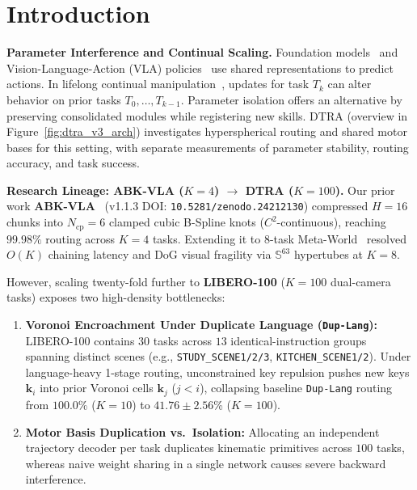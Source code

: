 \documentclass[10pt]{article}
\begin{document}
\section{Introduction}
\label{sec:intro}

\textbf{Parameter Interference and Continual Scaling.}
Foundation models~\cite{bommasani2021foundation} and Vision-Language-Action (VLA) policies~\cite{vaswani2017attention,brohan2023rt1,brohan2023rt2,octo2024,kim2024openvla,black2024pi0} use shared representations to predict actions. In lifelong continual manipulation~\cite{yu2020metaworld,wolczyk2021continual,liu2023libero}, updates for task $T_k$ can alter behavior on prior tasks $T_0, \dots, T_{k-1}$. Parameter isolation offers an alternative by preserving consolidated modules while registering new skills. DTRA (overview in Figure~\ref{fig:dtra_v3_arch}) investigates hyperspherical routing and shared motor bases for this setting, with separate measurements of parameter stability, routing accuracy, and task success.

\textbf{Research Lineage: ABK-VLA ($K=4$) $\to$ DTRA ($K=100$).}
Our prior work \textbf{ABK-VLA}~\cite{son2026abkvla} (v1.1.3 DOI: \texttt{10.5281/zenodo.24212130}) compressed $H=16$ chunks into $N_{\text{cp}}=6$ clamped cubic B-Spline knots ($C^2$-continuous), reaching $99.98\%$ routing across $K=4$ tasks. Extending it to 8-task Meta-World~\cite{yu2020metaworld} resolved $O(K)$ chaining latency and DoG visual fragility via $\mathbb{S}^{63}$ hypertubes at $K=8$.

However, scaling twenty-fold further to \textbf{LIBERO-100} ($K=100$ dual-camera tasks) exposes two high-density bottlenecks:
\begin{enumerate}[leftmargin=*,itemsep=1.5pt,topsep=2pt]
  \item \textbf{Voronoi Encroachment Under Duplicate Language (\texttt{Dup-Lang}):} LIBERO-100 contains $30$ tasks across $13$ identical-instruction groups spanning distinct scenes (e.g., \texttt{STUDY\_SCENE1/2/3}, \texttt{KITCHEN\_SCENE1/2}). Under language-heavy 1-stage routing, unconstrained key repulsion pushes new keys $\mathbf{k}_i$ into prior Voronoi cells $\mathbf{k}_j$ ($j < i$), collapsing baseline \texttt{Dup-Lang} routing from $100.0\%$ ($K=10$) to $41.76 \pm 2.56$\% ($K=100$).
  \item \textbf{Motor Basis Duplication vs.\ Isolation:} Allocating an independent trajectory decoder per task duplicates kinematic primitives across $100$ tasks, whereas naive weight sharing in a single network causes severe backward interference.
\end{enumerate}
\end{document}
